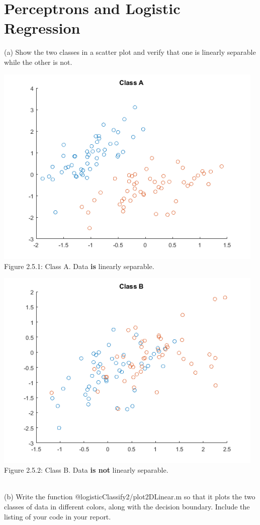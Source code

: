\documentclass[]{report}   %
\begin{document}
\section{Perceptrons and Logistic Regression}
{(a) Show the two classes in a scatter plot and verify that one is linearly separable while the other is not.}
\begin{center}
	\includegraphics[width=35em]{2_5_Figure_1.png}
	{Figure 2.5.1: Class A. Data {\bf is} linearly separable.}
\end{center} 
\begin{center}
	\includegraphics[width=35em]{2_5_Figure_2.png}
	{Figure 2.5.2: Class B. Data {\bf is not} linearly separable.}
\end{center} 
~\\
{(b) Write the function @logisticClassify2/plot2DLinear.m so that it plots the two
classes of data in different colors, along with the decision boundary. Include the listing of your code in your report.}
\end{document}
